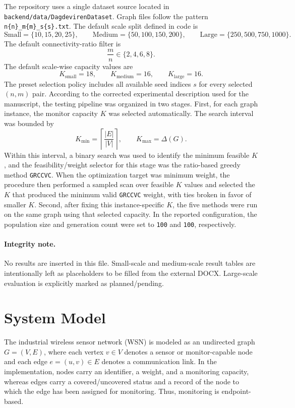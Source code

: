 \documentclass[11pt]{article}
\begin{document}
The repository uses a single dataset source located in \texttt{backend/data/DagdevirenDataset}. Graph files follow the pattern \texttt{n\{n\}\_m\{m\}\_s\{s\}.txt}. The default scale split defined in code is
\[
\text{Small}=\{10,15,20,25\},\qquad
\text{Medium}=\{50,100,150,200\},\qquad
\text{Large}=\{250,500,750,1000\}.
\]
The default connectivity-ratio filter is
\[
\frac{m}{n}\in\{2,4,6,8\}.
\]
The default scale-wise capacity values are
\[
K_{\text{small}}=18,\qquad K_{\text{medium}}=16,\qquad K_{\text{large}}=16.
\]
The preset selection policy includes all available seed indices \(s\) for every selected \((n,m)\) pair. According to the corrected experimental description used for the manuscript, the testing pipeline was organized in two stages. First, for each graph instance, the monitor capacity \(K\) was selected automatically. The search interval was bounded by
\[
K_{\min}=\left\lceil \frac{|E|}{|V|}\right\rceil,\qquad K_{\max}=\Delta(G).
\]
Within this interval, a binary search was used to identify the minimum feasible \(K\), and the feasibility/weight selector for this stage was the ratio-based greedy method \texttt{GRCCVC}. When the optimization target was minimum weight, the procedure then performed a sampled scan over feasible \(K\) values and selected the \(K\) that produced the minimum valid \texttt{GRCCVC} weight, with ties broken in favor of smaller \(K\). Second, after fixing this instance-specific \(K\), the five methods were run on the same graph using that selected capacity. In the reported configuration, the population size and generation count were set to \texttt{100} and \texttt{100}, respectively.

\paragraph{Integrity note.}
No results are inserted in this file. Small-scale and medium-scale result tables are intentionally left as placeholders to be filled from the external DOCX. Large-scale evaluation is explicitly marked as planned/pending.

\setcounter{section}{2}

\section{System Model}

The industrial wireless sensor network (WSN) is modeled as an undirected graph \(G=(V,E)\), where each vertex \(v\in V\) denotes a sensor or monitor-capable node and each edge \(e=(u,v)\in E\) denotes a communication link. In the implementation, nodes carry an identifier, a weight, and a monitoring capacity, whereas edges carry a covered/uncovered status and a record of the node to which the edge has been assigned for monitoring. Thus, monitoring is endpoint-based.
\end{document}
